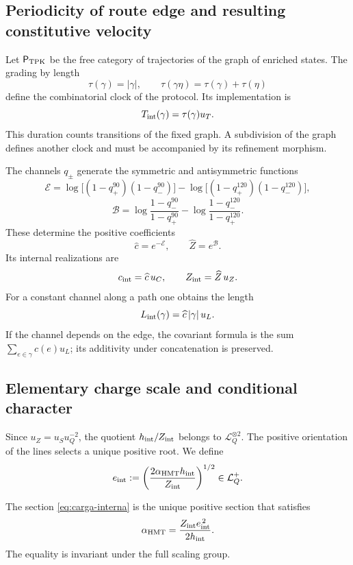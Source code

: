 \subsection{Periodicity of route edge and resulting constitutive velocity}

Let \(\mathsf P_{\rm TPK}\) be the free category of trajectories of the graph of
enriched states. The grading by length
\[
 \tau(\gamma)=|\gamma|,
 \qquad
 \tau(\gamma\eta)=\tau(\gamma)+\tau(\eta)
\]
define the combinatorial clock of the protocol. Its implementation is
\[
 T_{\rm int}(\gamma)=\tau(\gamma)u_T.
\]
This duration counts transitions of the fixed graph. A subdivision of the graph
defines another clock and must be accompanied by its refinement morphism.

The channels \(q_\pm\) generate the symmetric and antisymmetric functions
\[
 \mathcal E=
 \log\!\bigl[(1-q_+^{90})(1-q_-^{90})\bigr]
 -\log\!\bigl[(1-q_+^{120})(1-q_-^{120})\bigr],
\]
\[
 \mathcal B=
 \log\!\frac{1-q_-^{90}}{1-q_+^{90}}
 -\log\!\frac{1-q_-^{120}}{1-q_+^{120}}.
\]
These determine
the positive coefficients
\[
 \widehat c=e^{-\mathcal E},
 \qquad \widehat Z=e^{\mathcal B}.
\]
Its internal realizations are
\begin{equation}
 c_{\rm int}=\widehat c\,u_C,
 \qquad Z_{\rm int}=\widehat Z\,u_Z.
 \label{eq:cZ-internos}
\end{equation}
For a constant channel along a path one obtains the length
\begin{equation}
 L_{\rm int}(\gamma)
 =\widehat c\,|\gamma|\,u_L.
 \label{eq:longitud-ruta}
\end{equation}
If the channel depends on the edge, the covariant formula is the sum
\(\sum_{e\in\gamma}\widehat c(e)u_L\); its additivity under concatenation is
preserved.

\subsection{Elementary charge scale and conditional character}

Since \(u_Z=u_Su_Q^{-2}\), the quotient
\(h_{\rm int}/Z_{\rm int}\) belongs to \(\mathcal L_Q^{\otimes2}\).
The positive orientation of the lines selects a unique positive root.
We define
\begin{equation}
 e_{\rm int}
 :=\left(\frac{2\alpha_{\rm HMT}h_{\rm int}}
 {Z_{\rm int}}\right)^{1/2}\in\mathcal L_Q^+.
 \label{eq:carga-interna}
\end{equation}

\begin{proposition}
The section \eqref{eq:carga-interna} is the unique positive section that
satisfies
\[
 \alpha_{\rm HMT}
 =\frac{Z_{\rm int}e_{\rm int}^{\,2}}{2h_{\rm int}}.
\]
The equality is invariant under the full scaling group.
\end{proposition}

